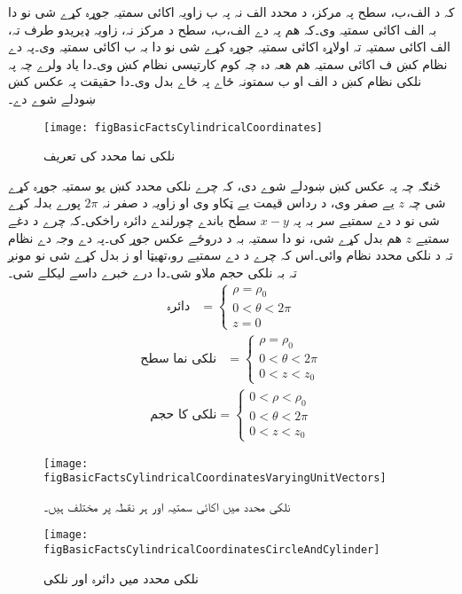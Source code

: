 کہ د الف،ب، سطح پہ مرکز، د محدد الف نہ پہ ب زاویہ اکائی سمتیہ جوړہ کړے شی نو دا بہ الف اکائی سمتیہ وی۔کہ ھم پہ دے الف،ب، سطح د مرکز نہ، زاویہ ډیریدو طرف تہ، الف اکائی سمتیہ تہ اولاړہ اکائی سمتیہ جوړہ کړے شی نو دا بہ ب اکائی سمتیہ وی۔پہ دے نظام کښ ف اکائی سمتیہ ھم ھعہ دہ چہ کوم کارتیسی نظام کښ وی۔دا یاد ولرے چہ پہ نلکی نظام کښ د الف او ب سمتونہ ځاے پہ ځاے بدل وی۔دا حقیقت پہ عکس کښ ښودلے شوے دے۔
\begin{figure}
\centering
\texttt{[image: figBasicFactsCylindricalCoordinates]}
\caption{نلکی نما محدد کی تعریف}
\label{شکل_حقائق_نلکی_نظام_تعریف}
\end{figure}
څنګہ چہ پہ عکس کښ ښودلے شوے دی، کہ چرے نلکی محدد کښ یو سمتیہ جوړہ کړے شی چہ $z$ یے صفر وی، د رداس قیمت یے ټکاو وی او زاویہ د صفر نہ $2\pi$ پورے بدلہ کړے شی نو د دے سمتیے سر بہ پہ $x-y$ سطح باندے چورلندے دائرہ راخکی۔کہ چرے د دغے سمتیے $z$ ھم بدل کړے شی، نو دا سمتیہ بہ د دروځے عکس جوړ کی۔پہ دے وجہ دے نظام تہ  د نلکی محدد نظام وائی۔اس کہ چرے د دے سمتیے  رو،تھیټا او ز بدل کړے شی نو مونږ تہ بہ نلکی حجم ملاو شی۔دا درے خبرے  داسے لیکلے شی۔
\begin{align}
 \text{دائرہ}&= \left\{ 
  \begin{array}{l}
    \rho=\rho_0\\
    0<\theta<2 \pi \\
    z=0
  \end{array} \right.
\end{align}
%
\begin{align}
 \text{نلکی نما سطح}&= \left\{ 
  \begin{array}{l}
    \rho=\rho_0\\
    0<\theta<2 \pi \\
  0<z<z_0
  \end{array} \right.
\end{align}
%
\begin{align}
 \text{نلکی کا حجم}= \left\{ 
  \begin{array}{l}
    0<\rho<\rho_0\\
    0<\theta<2 \pi \\
  0<z<z_0
  \end{array} \right.
\end{align}
%
\begin{figure}
\centering
\texttt{[image: figBasicFactsCylindricalCoordinatesVaryingUnitVectors]}
\caption{نلکی محدد میں اکائی سمتیہ  اور  ہر نقطہ پر مختلف ہیں۔}
\label{شکل_حقائق_نلکی_نظام_میں_اکائی_سمتیات_اٹل_نہیں}
\end{figure}
%
\begin{figure}
\centering
\texttt{[image: figBasicFactsCylindricalCoordinatesCircleAndCylinder]}
\caption{‫نلکی محدد میں دائرہ اور نلکی‬}
\label{شکل_حقائق_نلکی_نظام_میں_دائرہ_اور_نلکی}
\end{figure}


